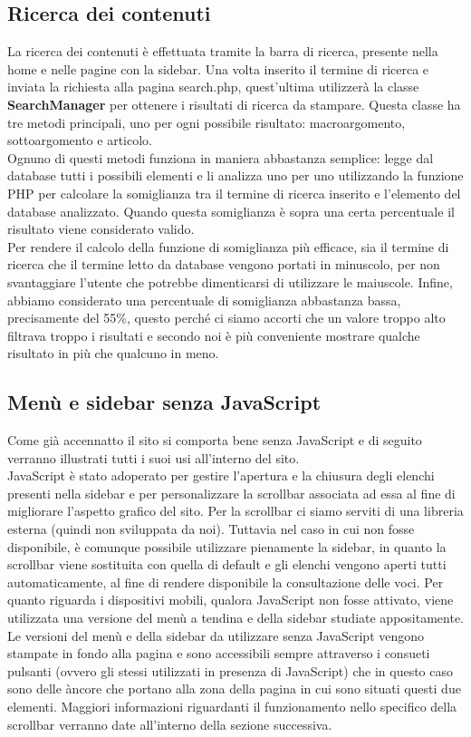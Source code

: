 \documentclass[12pt]{article}
\begin{document}
	
	\subsection{Ricerca dei contenuti}
	La ricerca dei contenuti è effettuata tramite la barra di ricerca, presente nella home e nelle pagine con la sidebar. Una volta inserito il termine di ricerca e inviata la richiesta alla pagina search.php, quest'ultima utilizzerà la classe \textbf{SearchManager} per ottenere i risultati di ricerca da stampare. Questa classe ha tre metodi principali, uno per ogni possibile risultato: macroargomento, sottoargomento e articolo. \\
Ognuno di questi metodi funziona in maniera abbastanza semplice: legge dal database tutti i possibili elementi e li analizza uno per uno utilizzando la funzione PHP  per calcolare la somiglianza tra il termine di ricerca inserito e l'elemento del database analizzato. Quando questa somiglianza è sopra una certa percentuale il risultato viene considerato valido. \\
Per rendere il calcolo della funzione di somiglianza più efficace, sia il termine di ricerca che il termine letto da database vengono portati in minuscolo, per non svantaggiare l'utente che potrebbe dimenticarsi di utilizzare le maiuscole. Infine, abbiamo considerato una percentuale di somiglianza abbastanza bassa, precisamente del 55\%, questo perché ci siamo accorti che un valore troppo alto filtrava troppo i risultati e secondo noi è più conveniente mostrare qualche risultato in più che qualcuno in meno.
	
	\subsection{Menù e sidebar senza JavaScript}
		Come già accennatto il sito si comporta bene senza JavaScript e di seguito verranno illustrati tutti i suoi usi all'interno del sito. \\
		JavaScript è stato adoperato per gestire l'apertura e la chiusura degli elenchi presenti nella sidebar e per  personalizzare la scrollbar associata ad essa al fine di migliorare l'aspetto grafico del sito. Per la scrollbar ci siamo serviti di una libreria esterna (quindi non sviluppata da noi). Tuttavia nel caso in cui non fosse disponibile, è comunque possibile utilizzare pienamente la sidebar, in quanto la scrollbar viene sostituita con quella di default e gli elenchi vengono aperti tutti automaticamente, al fine di rendere disponibile la consultazione delle voci. Per quanto riguarda i dispositivi mobili, qualora JavaScript non fosse attivato, viene utilizzata una versione del menù a tendina e della sidebar studiate appositamente. Le versioni del menù e della sidebar da utilizzare senza JavaScript vengono stampate in fondo alla pagina e sono accessibili sempre attraverso i consueti pulsanti (ovvero gli stessi utilizzati in presenza di JavaScript) che in questo caso sono delle àncore che portano alla zona della pagina in cui sono situati questi due elementi.
		Maggiori informazioni riguardanti il funzionamento nello specifico della scrollbar verranno date all'interno della sezione successiva.
\end{document}
